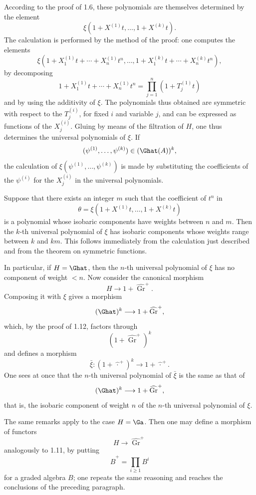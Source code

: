 \documentclass[11pt]{article}
\begin{document}
According to the proof of 1.6, these polynomials are themselves determined by the element
\[
  \xi(1+X^{(1)}t,\ldots,1+X^{(k)}t).
\]
The calculation is performed by the method of the proof: one computes the elements
\[
  \xi(1+X_1^{(1)}t+\cdots+X_n^{(1)}t^n,\ldots,
        1+X_1^{(k)}t+\cdots+X_n^{(k)}t^n),
\]
by decomposing
\[
  1+X_1^{(1)}t+\cdots+X_n^{(1)}t^n
  =\prod_{j=1}^n(1+T_j^{(1)}t)
\]
and by using the additivity of \(\xi\). The polynomials thus obtained are symmetric with respect to the \(T_j^{(i)}\), for fixed \(i\) and variable \(j\), and can be expressed as functions of the \(X_j^{(i)}\). Gluing by means of the filtration of \(H\), one thus determines the universal polynomials of \(\xi\). If
\[
  (\psi^{(1)},\ldots,\psi^{(k)})\in(\Ghat(A))^k,
\]
the calculation of \(\xi(\psi^{(1)},\ldots,\psi^{(k)})\) is made by substituting the coefficients of the \(\psi^{(i)}\) for the \(X_j^{(i)}\) in the universal polynomials.

Suppose that there exists an integer \(m\) such that the coefficient of \(t^n\) in
\[
  \theta=\xi(1+X^{(1)}t,\ldots,1+X^{(k)}t)
\]
is a polynomial whose isobaric components have weights between \(n\) and \(m\). Then the \(k\)-th universal polynomial of \(\xi\) has isobaric components whose weights range between \(k\) and \(km\). This follows immediately from the calculation just described and from the theorem on symmetric functions.

In particular, if \(H=\Ghat\), then the \(n\)-th universal polynomial of \(\xi\) has no component of weight \(<n\). Now consider the canonical morphism
\[
  H\longrightarrow 1+\widehat{\operatorname{Gr}}^{+}.
\]
Composing it with \(\xi\) gives a morphism
\[
  (\Ghat)^k\longrightarrow 1+\widehat{\operatorname{Gr}}^{+},
\]
which, by the proof of 1.12, factors through
\[
  (1+\widehat{\operatorname{Gr}}^{+})^k
\]
and defines a morphism
\[
  \bar\xi:(1+\widehat{\,\cdot\,}^{+})^k\longrightarrow 1+\widehat{\,\cdot\,}^{+}.
\]
One sees at once that the \(n\)-th universal polynomial of \(\bar\xi\) is the same as that of
\[
  (\Ghat)^k\longrightarrow 1+\widehat{\operatorname{Gr}}^{+},
\]
that is, the isobaric component of weight \(n\) of the \(n\)-th universal polynomial of \(\xi\).

The same remarks apply to the case \(H=\Ga\). Then one may define a morphism of functors
\[
  H\longrightarrow \widehat{\operatorname{Gr}}^{+}
\]
analogously to 1.11, by putting
\[
  \widehat B^{+}=\prod_{i\geq 1}B^i
\]
for a graded algebra \(B\); one repeats the same reasoning and reaches the conclusions of the preceding paragraph.
\end{document}
